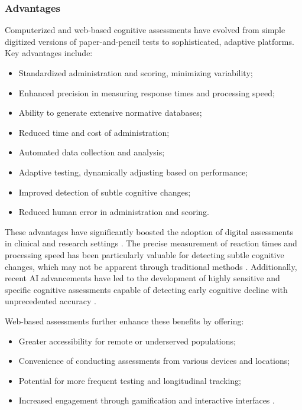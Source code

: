 \subsubsection{Advantages}
Computerized and web-based cognitive assessments have evolved from simple digitized versions of paper-and-pencil tests to sophisticated, adaptive platforms. Key advantages include:
\begin{itemize}
    \item Standardized administration and scoring, minimizing variability;
    \item Enhanced precision in measuring response times and processing speed;
    \item Ability to generate extensive normative databases;
    \item Reduced time and cost of administration;
    \item Automated data collection and analysis;
    \item Adaptive testing, dynamically adjusting based on performance;
    \item Improved detection of subtle cognitive changes;
    \item Reduced human error in administration and scoring.
\end{itemize}

These advantages have significantly boosted the adoption of digital assessments in clinical and research settings \cite{Wild2008}. The precise measurement of reaction times and processing speed has been particularly valuable for detecting subtle cognitive changes, which may not be apparent through traditional methods \cite{Zygouris2017}. Additionally, recent AI advancements have led to the development of highly sensitive and specific cognitive assessments capable of detecting early cognitive decline with unprecedented accuracy \cite{Petti2020}.

Web-based assessments further enhance these benefits by offering:
\begin{itemize}
    \item Greater accessibility for remote or underserved populations;
    \item Convenience of conducting assessments from various devices and locations;
    \item Potential for more frequent testing and longitudinal tracking;
    \item Increased engagement through gamification and interactive interfaces \cite{Lumsden2016}.
\end{itemize}

